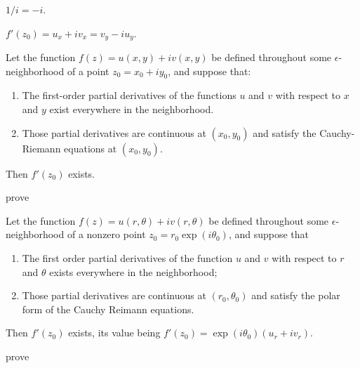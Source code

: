 \documentclass{article}
\begin{document}
\begin{remark}
	\(1/i=-i\).
\end{remark}
\begin{corollary}
	\(f'(z_0)=u_x+iv_x=v_y-iu_y\).
\end{corollary}
\begin{theorem}
	Let the function \(f(z)=u(x,y)+iv(x,y)\) be defined throughout some \(\epsilon\)-neighborhood of a point \(z_0=x_0+iy_0\), and suppose that:
	\begin{enumerate}
		\item The first-order partial derivatives of the functions \(u\) and \(v\) with respect to \(x\) and \(y\) exist everywhere in the neighborhood.
		\item Those partial derivatives are continuous at \((x_0,y_0)\) and satisfy the Cauchy-Riemann equations at \((x_0, y_0)\).
	\end{enumerate}
	Then \(f'(z_0)\) exists.
\end{theorem}
\begin{IEEEproof}
	prove
\end{IEEEproof}
\begin{theorem}
	Let the function \(f(z)=u(r,\theta)+iv(r,\theta)\) be defined throughout some \(\epsilon\)-neighborhood of a nonzero point \(z_0=r_0\exp(i\theta_0)\), and suppose that
	\begin{enumerate}
		\item The first order partial derivatives of the function \(u\) and \(v\) with respect to \(r\) and \(\theta\) exists everywhere in the neighborhood;
		\item Those partial derivatives are continuous at \((r_0,\theta_0)\) and satisfy the polar form of the Cauchy Reimann equations.
	\end{enumerate}
	Then \(f'(z_0)\) exists, its value being \(f'(z_0)=\exp(i\theta_0)(u_r+iv_r)\).
\end{theorem}
\begin{IEEEproof}
	prove
\end{IEEEproof}
\end{document}
